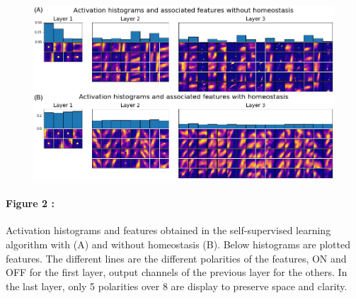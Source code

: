 \documentclass[12pt]{article}
\begin{document}
\begin{figure}
\vspace{-20pt}
\includegraphics[width=1.03\linewidth]{../notebooks/fig/layerz.png}
\vspace{-55pt}
\caption*
{
\label{fig:fig2}
}
\end{figure}

\paragraph*{Figure 2 : }
Activation histograms and features obtained in the self-supervised learning algorithm with (A) and without homeostasis (B). Below histograms are plotted features. The different lines are the different polarities of the features, ON and OFF for the first layer, output channels of the previous layer for the others. In the last layer, only 5 polarities over 8 are display to preserve space and clarity.
\end{document}
